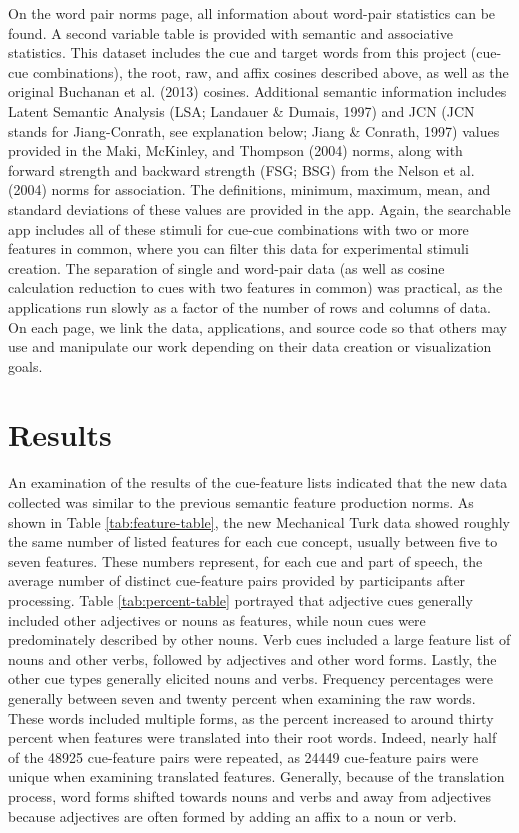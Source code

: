 \documentclass[english,,man]{apa6}
\theoremstyle{definition}
\theoremstyle{definition}
\theoremstyle{definition}
\theoremstyle{remark}
\begin{document}
On the word pair norms page, all information about word-pair statistics
can be found. A second variable table is provided with semantic and
associative statistics. This dataset includes the cue and target words
from this project (cue-cue combinations), the root, raw, and affix
cosines described above, as well as the original Buchanan et al. (2013)
cosines. Additional semantic information includes Latent Semantic
Analysis (LSA; Landauer \& Dumais, 1997) and JCN (JCN stands for
Jiang-Conrath, see explanation below; Jiang \& Conrath, 1997) values
provided in the Maki, McKinley, and Thompson (2004) norms, along with
forward strength and backward strength (FSG; BSG) from the Nelson et al.
(2004) norms for association. The definitions, minimum, maximum, mean,
and standard deviations of these values are provided in the app. Again,
the searchable app includes all of these stimuli for cue-cue
combinations with two or more features in common, where you can filter
this data for experimental stimuli creation. The separation of single
and word-pair data (as well as cosine calculation reduction to cues with
two features in common) was practical, as the applications run slowly as
a factor of the number of rows and columns of data. On each page, we
link the data, applications, and source code so that others may use and
manipulate our work depending on their data creation or visualization
goals.

\section{Results}\label{results}

An examination of the results of the cue-feature lists indicated that
the new data collected was similar to the previous semantic feature
production norms. As shown in Table \ref{tab:feature-table}, the new
Mechanical Turk data showed roughly the same number of listed features
for each cue concept, usually between five to seven features. These
numbers represent, for each cue and part of speech, the average number
of distinct cue-feature pairs provided by participants after processing.
Table \ref{tab:percent-table} portrayed that adjective cues generally
included other adjectives or nouns as features, while noun cues were
predominately described by other nouns. Verb cues included a large
feature list of nouns and other verbs, followed by adjectives and other
word forms. Lastly, the other cue types generally elicited nouns and
verbs. Frequency percentages were generally between seven and twenty
percent when examining the raw words. These words included multiple
forms, as the percent increased to around thirty percent when features
were translated into their root words. Indeed, nearly half of the 48925
cue-feature pairs were repeated, as 24449 cue-feature pairs were unique
when examining translated features. Generally, because of the
translation process, word forms shifted towards nouns and verbs and away
from adjectives because adjectives are often formed by adding an affix
to a noun or verb.
\end{document}
